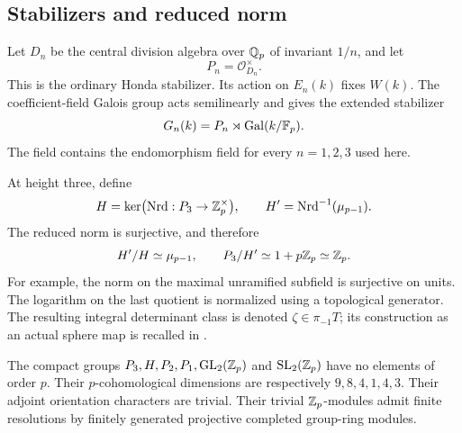 \subsection{Stabilizers and reduced norm}

Let \(D_n\) be the central division algebra over \(\mathbb Q_p\) of invariant
\(1/n\), and let
\[
 P_n=\mathcal O_{D_n}^{\times}.
\]
This is the ordinary Honda stabilizer. Its action on \(E_n(k)\) fixes
\(W(k)\). The coefficient-field Galois group acts semilinearly and gives
the extended stabilizer
\[
 G_n(k)=P_n\rtimes\operatorname{Gal}(k/\mathbb F_p).
\]
The field contains the endomorphism field for every \(n=1,2,3\) used here.

At height three, define
\[
 H=\ker\bigl(\operatorname{Nrd}:P_3\to\mathbb Z_p^\times\bigr),\qquad
 H'=\operatorname{Nrd}^{-1}(\mu_{p-1}).
\]
The reduced norm is surjective, and therefore
\begin{equation}\label{h3:eq:framework-norm-quotients}
 H'/H\simeq\mu_{p-1},\qquad
 P_3/H'\simeq1+p\mathbb Z_p\simeq\mathbb Z_p.
\end{equation}
For example, the norm on the maximal unramified subfield is surjective
on units. The logarithm on the last quotient is normalized using a
topological generator. The resulting integral determinant class is
denoted \(\zeta\in\pi_{-1}T\); its construction as an actual sphere map
is recalled in .

\begin{lemma}\label{h3:lem:framework-groups}
The compact groups \(P_3,H,P_2,P_1,\operatorname{GL}_2(\mathbb Z_p)\) and
\(\operatorname{SL}_2(\mathbb Z_p)\) have no elements of order \(p\). Their \(p\)-cohomological
dimensions are respectively \(9,8,4,1,4,3\). Their adjoint orientation
characters are trivial. Their trivial \(\mathbb Z_p\)-modules admit finite
resolutions by finitely generated projective completed group-ring
modules.
\end{lemma}

